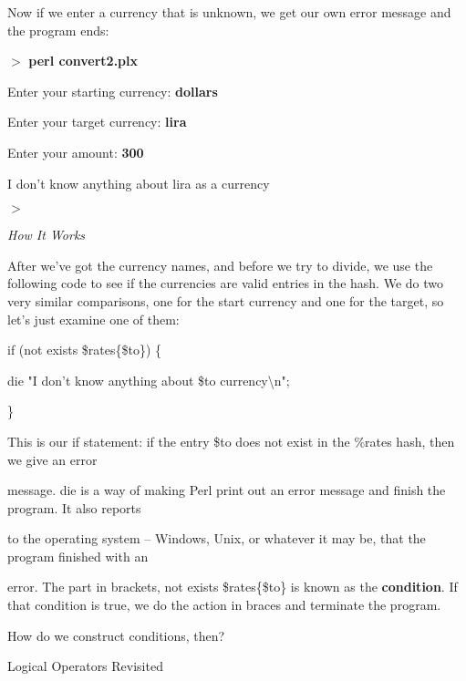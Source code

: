 \documentclass[a4paper,11pt]{book}
\begin{document}
\noindent 

\noindent Now if we enter a currency that is unknown, we get our own error message and the program ends:

\noindent 

\noindent $>$ \textbf{perl convert2.plx}

\noindent Enter your starting currency: \textbf{dollars}

\noindent Enter your target currency: \textbf{lira}

\noindent Enter your amount: \textbf{300}

\noindent I don't know anything about lira as a currency

\noindent $>$

\noindent 

\noindent \textit{How It Works}

\noindent After we've got the currency names, and before we try to divide, we use the following code to see if the currencies are valid entries in the hash. We do two very similar comparisons, one for the start currency and one for the target, so let's just examine one of them:

\noindent 

\noindent if (not exists \$rates\{\$to\}) \{

\noindent die "I don't know anything about \$to currency\textbackslash n";

\noindent \}

\noindent 

\noindent 

\noindent This is our if statement: if the entry \$to does not exist in the \%rates hash, then we give an error

\noindent message. die is a way of making Perl print out an error message and finish the program. It also reports

\noindent to the operating system -- Windows, Unix, or whatever it may be, that the program finished with an

\noindent error. The part in brackets, not exists \$rates\{\$to\} is known as the \textbf{condition}. If that condition is true, we do the action in braces and terminate the program.

\noindent 

\noindent How do we construct conditions, then?

\noindent 

\noindent Logical Operators Revisited

\noindent 
\end{document}
